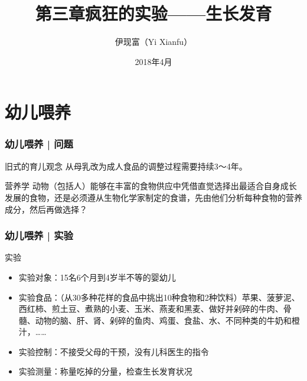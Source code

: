 



\title[生长发育]{第三章\quad 疯狂的实验——生长发育}
\author[Yixf]{伊现富（Yi Xianfu）}
\date{2018年4月}



\section{幼儿喂养}
\begin{frame}
  \frametitle{幼儿喂养 | 问题}
  \begin{block}{旧式的育儿观念}
    从母乳改为成人食品的调整过程需要持续3～4年。
  \end{block}
  \pause
  \begin{block}{营养学}
    动物（包括人）能够在丰富的食物供应中凭借直觉选择出最适合自身成长发展的食物，还是必须遵从生物化学家制定的食谱，先由他们分析每种食物的营养成分，然后再做选择？
  \end{block}
\end{frame}

\begin{frame}
  \frametitle{幼儿喂养 | 实验}
  \begin{block}{实验}
    \begin{itemize}
      \item 实验对象：15名6个月到4岁半不等的婴幼儿
      \item 实验食品：（从30多种花样的食品中挑出10种食物和2种饮料）苹果、菠萝泥、西红柿、煎土豆、煮熟的小麦、玉米、燕麦和黑麦、做好并剁碎的牛肉、骨髓、动物的脑、肝、肾、剁碎的鱼肉、鸡蛋、食盐、水、不同种类的牛奶和橙汁，……
      \item 实验控制：不接受父母的干预，没有儿科医生的指令
      \item 实验测量：称量吃掉的分量，检查生长发育状况
    \end{itemize}
  \end{block}
\end{frame}

